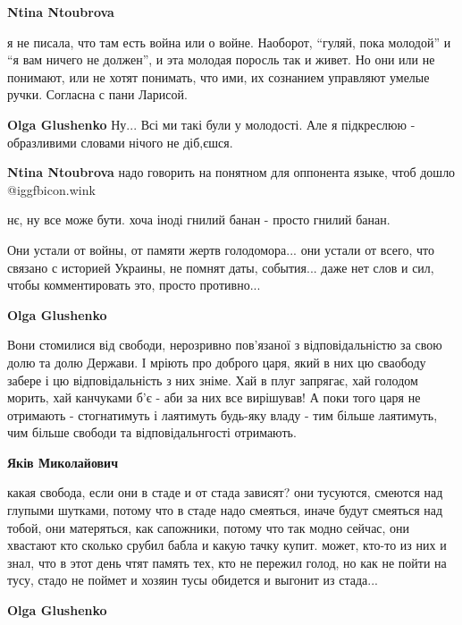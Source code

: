 \begin{itemize}
\begin{itemize}
\textbf{Ntina Ntoubrova} 

я не писала, что там есть война или о войне. Наоборот, \enquote{гуляй, пока молодой} и \enquote{я
вам ничего не должен}, и эта молодая поросль так и живет. Но они или не
понимают, или не хотят понимать, что ими, их сознанием управляют умелые ручки.
Согласна с пани Ларисой.

\textbf{Olga Glushenko} Ну... Всі ми такі були у молодості. Але я підкреслюю - образливими словами нічого не діб,єшся.

\textbf{Ntina Ntoubrova} надо говорить на понятном для оппонента языке, чтоб дошло @igg{fbicon.wink} 

\end{itemize} %


нє, ну все може бути. хоча іноді гнилий банан - просто гнилий банан.


Они устали от войны, от памяти жертв голодомора... они устали от всего, что
связано с историей Украины, не помнят даты, события... даже нет слов и сил, чтобы
комментировать это, просто противно...

\begin{itemize} %
\textbf{Olga Glushenko} 

Вони стомилися від свободи, нерозривно пов'язаної з відповідальністю за свою
долю та долю Держави. І мріють про доброго царя, який в них цю сваободу забере
і цю відповідальність з них зніме. Хай в плуг запрягає, хай голодом морить, хай
канчуками б'є - аби за них все вирішував! А поки того царя не отримають -
стогнатимуть і лаятимуть будь-яку владу - тим більше лаятимуть, чим більше
свободи та відповідальнгості отримають.


\textbf{Яків Миколайович} 

какая свобода, если они в стаде и от стада зависят? они тусуются, смеются над
глупыми шутками, потому что в стаде надо смеяться, иначе будут смеяться над
тобой, они матеряться, как сапожники, потому что так модно сейчас, они хвастают кто
сколько срубил бабла и какую тачку купит. может, кто-то из них и знал, что в этот
день чтят память тех, кто не пережил голод, но как не пойти на тусу, стадо не
поймет и хозяин тусы обидется и выгонит из стада...

\textbf{Olga Glushenko} 


\end{itemize}
\end{itemize}
